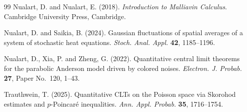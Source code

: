 \documentclass[12pt]{article}
\begin{document}
\begin{thebibliography}{99}
Nualart, D. and Nualart, E. (2018).
{\em Introduction to Malliavin Calculus}.
Cambridge University Press, Cambridge.

Nualart, D. and Saikia, B. (2024).
Gaussian fluctuations of spatial averages of a system of stochastic heat
equations.
{\em Stoch. Anal. Appl.}
{\bf 42}, 1185--1196.

Nualart, D., Xia, P. and Zheng, G. (2022).
Quantitative central limit theorems for the parabolic Anderson model driven
by colored noises.
{\em Electron. J. Probab.}
{\bf 27}, Paper No.~120, 1--43.

Trauthwein, T. (2025).
Quantitative CLTs on the Poisson space via Skorohod estimates and
$p$-Poincar\'e inequalities.
{\em Ann. Appl. Probab.}
{\bf 35}, 1716--1754.

\end{thebibliography}










\end{document}

